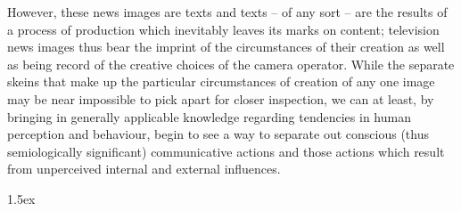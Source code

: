 \documentclass[11pt, oneside, a4paper]{scrartcl}
\begin{document}

However, these news images are texts and texts -- of any sort -- are the results of a process of production which inevitably leaves its marks on content; television news images thus bear the imprint of the circumstances of their creation as well as being  record of the creative choices of the camera operator. While the separate skeins that make up the particular circumstances of creation of any one image may be near impossible to pick apart for closer inspection, we can at least, by bringing in generally applicable knowledge regarding tendencies in human perception and behaviour, begin to see a way to separate out conscious (thus semiologically significant) communicative actions and those actions which result from unperceived internal and external influences.


\renewcommand{\makeenmark}{%
          \hbox{\bf \theenmark. \,\,}}%
\newpage 
\begingroup 
\parindent 0pt 
\parskip 1.5ex 
\def\enotesize{\normalsize} 
\theendnotes
\endgroup

\pagebreak
\onehalfspacing

\end{document}
